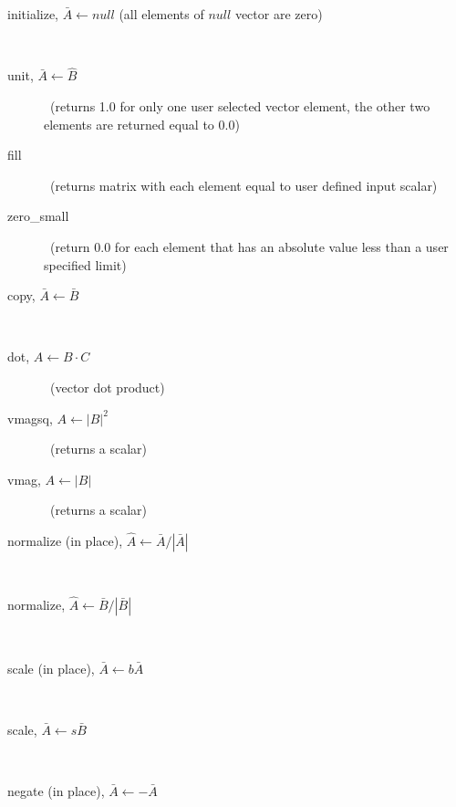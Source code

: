 \begin{description}
  \item[initialize, $\bar{A}\leftarrow null$ (all elements of $null$ vector are zero)]\ \newline

  \item[unit, $\bar{A}\leftarrow \hat{B}$]\ (returns 1.0 for only one user selected vector element, the
   other two elements are returned equal to 0.0) \newline

  \item[fill]\ (returns matrix with each element equal to user defined input scalar) \newline

  \item[zero\_small]\ (return 0.0 for each element that has an absolute value less than a user specified limit)\newline

  \item[copy, $\bar{A} \leftarrow \bar{B}$]\ \newline

  \item[dot, $A \leftarrow B \cdot C$]\ (vector dot product) \newline

  \item[vmagsq, $A \leftarrow |B|^2$]\ (returns a scalar)\newline

  \item[vmag, $A \leftarrow |B|$]\ (returns a scalar)\newline

  \item[normalize (in place), $\hat{A} \leftarrow \bar{A}/|\bar{A}|$]\ \newline

  \item[normalize, $\hat{A} \leftarrow \bar{B}/|\bar{B}|$]\ \newline

  \item[scale (in place), $\bar{A} \leftarrow b\bar{A}$]\ \newline

  \item[scale, $\bar{A} \leftarrow s\bar{B}$]\ \newline

  \item[negate (in place), $\bar{A} \leftarrow -\bar{A}$]\ \newline


\end{description}
